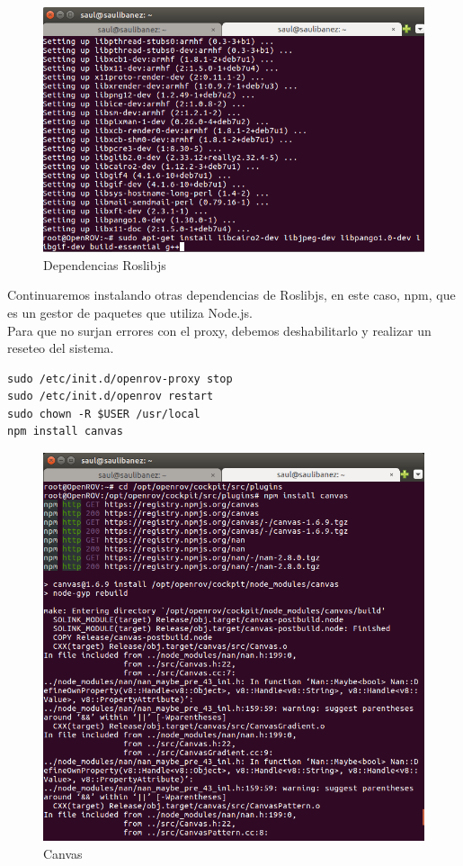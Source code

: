 \begin{figure} [hbtp]
  \begin{center}
    \includegraphics[width=12cm]{img/cap4/dependencias_roslibjs}
  \end{center}
  \caption{Dependencias Roslibjs}
  \label{fig:Dependencias Roslibjs}
\end{figure}
\newpage
Continuaremos instalando otras dependencias de Roslibjs, en este caso, npm, que es un gestor de paquetes que utiliza Node.js.
\\Para que no surjan errores con el proxy, debemos deshabilitarlo y realizar un reseteo del sistema. 
\renewcommand{\lstlistingname}{}
\begin{lstlisting}[caption=Dependencias Roslibjs, label={lst:roslibjs}]
sudo /etc/init.d/openrov-proxy stop
sudo /etc/init.d/openrov restart
sudo chown -R $USER /usr/local 
npm install canvas 
\end{lstlisting}

\newpage
\begin{figure} [hbtp]
  \begin{center}
    \includegraphics[width=12cm]{img/cap4/canvas}
  \end{center}
  \caption{Canvas}
  \label{fig:canvas}
\end{figure}


